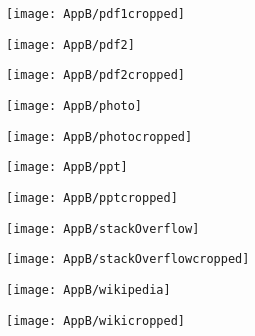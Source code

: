 \documentclass[draft,final]{vutinfth} %
\begin{document}
\begin{appendices}
\begin{figure}[H]
\begin{subfigure}[b]{0.45\columnwidth}
				\centering
				\texttt{[image: AppB/pdf1cropped]}
			\end{subfigure}
		\end{figure}   
		\begin{figure}[H]
			\centering
			\begin{subfigure}[b]{0.45\columnwidth}
				\centering
				\texttt{[image: AppB/pdf2]}
			\end{subfigure}
			\begin{subfigure}[b]{0.45\columnwidth}
				\centering
				\texttt{[image: AppB/pdf2cropped]}
			\end{subfigure}
		\end{figure}  
		\begin{figure}[H]
			\centering
			\begin{subfigure}[b]{0.45\columnwidth}
				\centering
				\texttt{[image: AppB/photo]}
			\end{subfigure}
			\begin{subfigure}[b]{0.45\columnwidth}
				\centering
				\texttt{[image: AppB/photocropped]}
			\end{subfigure}
		\end{figure}  
		\begin{figure}[H]
			\centering
			\begin{subfigure}[b]{0.45\columnwidth}
				\centering
				\texttt{[image: AppB/ppt]}
			\end{subfigure}
			\begin{subfigure}[b]{0.45\columnwidth}
				\centering
				\texttt{[image: AppB/pptcropped]}
			\end{subfigure}
		\end{figure}  
		\begin{figure}[H]
			\centering
			\begin{subfigure}[b]{0.45\columnwidth}
				\centering
				\texttt{[image: AppB/stackOverflow]}
			\end{subfigure}
			\begin{subfigure}[b]{0.45\columnwidth}
				\centering
				\texttt{[image: AppB/stackOverflowcropped]}
			\end{subfigure}
		\end{figure} 
		\begin{figure}[H]
			\centering
			\begin{subfigure}[b]{0.45\columnwidth}
				\centering
				\texttt{[image: AppB/wikipedia]}
			\end{subfigure}
			\begin{subfigure}[b]{0.45\columnwidth}
				\centering
				\texttt{[image: AppB/wikicropped]}
			\end{subfigure}
		\end{figure}   
	\end{appendices}
\end{document}

